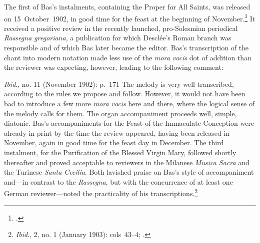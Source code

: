 The first of Bas's instalments, containing the Proper for All Saints, was released on 15~October~1902, in good time for the feast at the beginning of November.\footcite[p.~153]{Pubblicazionigregoriane1902a}
It received a positive review in the recently launched, pro-Solesmian periodical \emph{Rassegna gregoriana}, a publication for which Desclée's Roman branch was responsible and of which Bas later became the editor.
Bas's transcription of the chant into modern notation made less use of the \emph{mora vocis} dot of addition than the reviewer was expecting, however, leading to the following comment:

  {\emph{Ibid}., no. 11 (November 1902): p.~171}
{The melody is very well transcribed, according to the rules we propose and follow. However, it would not have been bad to introduce a few more \emph{mora vocis} here and there, where the logical sense of the melody calls for them. The organ accompaniment proceeds well, simple, diatonic.}
\nocite{Pubblicazionigregoriane1902}%
\noindent
Bas's accompaniments for the Feast of the Immaculate Conception were already in print by the time the review appeared, having been released in November, again in good time for the feast day in December.
The third instalment, for the Purification of the Blessed Virgin Mary, followed shortly thereafter and proved acceptable to reviewers in the Milanese \emph{Musica Sacra} and the Turinese \emph{Santa Cecilia}.
Both lavished praise on Bas's style of accompaniment and---in contrast to the \emph{Rassegna}, but with the concurrence of at least one German reviewer---noted the practicality of his transcriptions.\footnote{\emph{Ibid}., 2, no. 1 (January 1903): cols~43--4; \cite[179]{Besprechungen1902}.}
\nocite{R.Pubblicazionigregoriane1903}%

